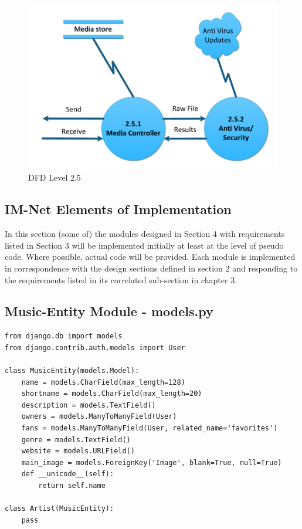 \documentclass[letterpaper,12pt]{article}
\newcommand{\Section}[1]{\section{#1} \setcounter{figure}{0}}
\begin{document}
{\begin{figure}[h]
\centering
\includegraphics[scale=0.7]{DFD_level_2_5.pdf}
\caption{DFD Level 2.5}
\label{fig:DFD_level_2.5}
\end{figure}

\eject
 
\textcolor{section}{\Section{IM-Net Elements of Implementation}}

In this section (some of) the modules designed in Section 4 with requirements listed in Section 3 will be implemented initially at least at the level of pseudo code. Where possible, actual code will be provided. Each module is implemented in correspondence with the design sections defined in section 2 and responding to the requirements listed in its correlated sub-section in chapter 3.

\textcolor{subsection}{\subsection{Music-Entity Module - models.py}}
\begin{verbatim}
from django.db import models
from django.contrib.auth.models import User

class MusicEntity(models.Model):
    name = models.CharField(max_length=128)
    shortname = models.CharField(max_length=20)
    description = models.TextField()
    owners = models.ManyToManyField(User)
    fans = models.ManyToManyField(User, related_name='favorites')
    genre = models.TextField()
    website = models.URLField()
    main_image = models.ForeignKey('Image', blank=True, null=True)
    def __unicode__(self):
        return self.name

class Artist(MusicEntity):
    pass


\end{verbatim}}
\end{document}
